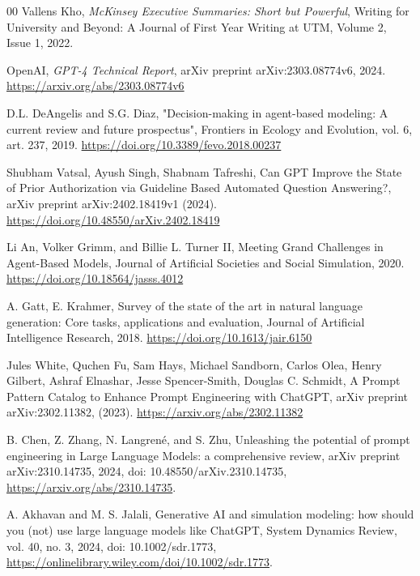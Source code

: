 \documentclass[preprint,12pt]{elsarticle}
\begin{document}
\begin{thebibliography}{00}
Vallens Kho,
\textit{McKinsey Executive Summaries: Short but Powerful},
Writing for University and Beyond: A Journal of First Year Writing at UTM, Volume 2, Issue 1, 2022.



OpenAI,
\textit{GPT-4 Technical Report},
arXiv preprint arXiv:2303.08774v6, 2024.
\href{https://arxiv.org/abs/2303.08774v6}{https://arxiv.org/abs/2303.08774v6}

D.L. DeAngelis and S.G. Diaz,
"Decision-making in agent-based modeling: A current review and future prospectus",
Frontiers in Ecology and Evolution, vol. 6, art. 237, 2019.
\href{https://doi.org/10.3389/fevo.2018.00237}{https://doi.org/10.3389/fevo.2018.00237}


Shubham Vatsal, Ayush Singh, Shabnam Tafreshi,
Can GPT Improve the State of Prior Authorization via Guideline Based Automated Question Answering?,
arXiv preprint arXiv:2402.18419v1 (2024).
\href{https://doi.org/10.48550/arXiv.2402.18419}{https://doi.org/10.48550/arXiv.2402.18419}

Li An, Volker Grimm, and Billie L. Turner II,
Meeting Grand Challenges in Agent-Based Models,
Journal of Artificial Societies and Social Simulation, 2020.
\href{https://doi.org/10.18564/jasss.4012}{https://doi.org/10.18564/jasss.4012}

A. Gatt, E. Krahmer,
Survey of the state of the art in natural language generation: Core tasks, applications and evaluation,
Journal of Artificial Intelligence Research, 2018.
\href{https://doi.org/10.1613/jair.6150}{https://doi.org/10.1613/jair.6150}

Jules White, Quchen Fu, Sam Hays, Michael Sandborn, Carlos Olea, Henry Gilbert, Ashraf Elnashar, Jesse Spencer-Smith, Douglas C. Schmidt,
A Prompt Pattern Catalog to Enhance Prompt Engineering with ChatGPT,
arXiv preprint arXiv:2302.11382, (2023).
\href{https://arxiv.org/abs/2302.11382}{https://arxiv.org/abs/2302.11382}

B. Chen, Z. Zhang, N. Langrené, and S. Zhu,
Unleashing the potential of prompt engineering in Large Language Models: a comprehensive review,
arXiv preprint arXiv:2310.14735, 2024,
doi: 10.48550/arXiv.2310.14735,
\href{https://arxiv.org/abs/2310.14735}{https://arxiv.org/abs/2310.14735}.

A. Akhavan and M. S. Jalali,
Generative AI and simulation modeling: how should you (not) use large language models like ChatGPT,
System Dynamics Review, vol. 40, no. 3, 2024,
doi: 10.1002/sdr.1773,
\href{https://onlinelibrary.wiley.com/doi/10.1002/sdr.1773}{https://onlinelibrary.wiley.com/doi/10.1002/sdr.1773}.



\end{thebibliography}
\end{document}
